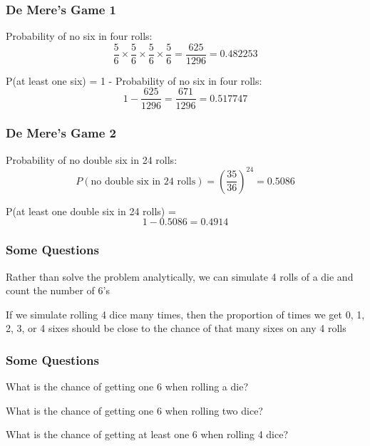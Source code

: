 \documentclass[12pt]{beamer}\usepackage[]{graphicx}\usepackage[]{color}
\begin{document}

\begin{frame}[fragile]
\frametitle{De Mere's Game 1}

Probability of no six in four rolls:
$$
\frac{5}{6} \times \frac{5}{6} \times \frac{5}{6} \times \frac{5}{6} = \frac{625}{1296} = 0.482253
$$

\bigskip
\pause
P(at least one six) = 1 - Probability of no six in four rolls:
$$
1 - \frac{625}{1296} = \frac{671}{1296} = 0.517747
$$

\end{frame}


\begin{frame}[fragile]
\frametitle{De Mere's Game 2}

Probability of no double six in 24 rolls:
$$
P(\text{no double six in 24 rolls}) = \left(\frac{35}{36}\right)^{24} = 0.5086
$$

\bigskip
\pause
P(at least one double six in 24 rolls) = 
$$
1 - 0.5086 = 0.4914
$$

\end{frame}


\begin{frame}
\begin{center}
\Huge{}
\end{center}
\end{frame}


\begin{frame}
\frametitle{Some Questions}

\bbi
  \item Rather than solve the problem analytically, we can simulate 4 rolls of a die and count the number of 6's
  \item If we simulate rolling 4 dice many times, then the proportion of times we get 0, 1, 2, 3, or 4 sixes should be close to the chance of that many sixes on any 4 rolls
\ei

\end{frame}


\begin{frame}
\frametitle{Some Questions}

\bbi
  \item What is the chance of getting one 6 when rolling a die?
  \item What is the chance of getting one 6 when rolling two dice?
  \item What is the chance of getting at least one 6 when rolling 4 dice?
\ei

\end{frame}
\end{document}
